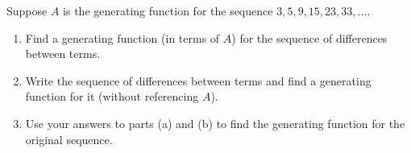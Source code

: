\documentclass[10pt,]{book}
\theoremstyle{plain}
\theoremstyle{definition}
\theoremstyle{definition}
\theoremstyle{definition}
\theoremstyle{definition}
\numberwithin{equation}{chapter}
\begin{document}
\begin{divisionexercise}{16}\hypertarget{exercise-99}{}
\hypertarget{p-1158}{}%
Suppose \(A\) is the generating function for the sequence \(3, 5, 9, 15, 23, 33, \ldots\).%
\par
\hypertarget{p-1159}{}%
\leavevmode%
\begin{enumerate}[label=(\alph*)]
\item\hypertarget{li-206}{}\hypertarget{p-1160}{}%
Find a generating function (in terms of \(A\)) for the sequence of differences between terms.%
\item\hypertarget{li-207}{}\hypertarget{p-1161}{}%
Write the sequence of differences between terms and find a generating function for it (without referencing \(A\)).%
\item\hypertarget{li-208}{}\hypertarget{p-1162}{}%
Use your answers to parts (a) and (b) to find the generating function for the original sequence.%
\end{enumerate}
%
\end{divisionexercise}%
\typeout{************************************************}
\typeout{************************************************}
\end{document}
